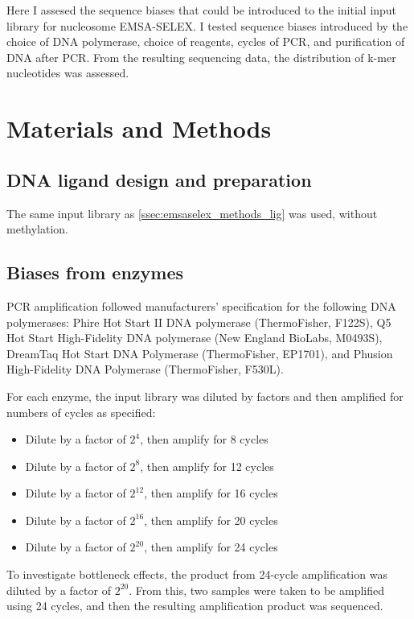 \documentclass[parskip=full, numbers=noenddot]{scrreprt}
\begin{document}
Here I assesed the sequence biases that could be introduced to the initial input library for nucleosome EMSA-SELEX.  I tested sequence biases introduced by the choice of DNA polymerase, choice of reagents, cycles of PCR, and purification of DNA after PCR.  From the resulting sequencing data, the distribution of k-mer nucleotides was assessed.

\section{Materials and Methods}
\label{sec:pcrbias_methods}

\subsection{DNA ligand design and preparation}
\label{ssec:pcrbias_methods_lig}

The same input library as \ref{ssec:emsaselex_methods_lig} was used, without methylation.

\subsection{Biases from enzymes}
\label{ssec:pcrbias_methods_enz}

PCR amplification followed manufacturers' specification for the following DNA polymerases: Phire Hot Start II DNA polymerase (ThermoFisher, F122S), Q5 Hot Start High-Fidelity DNA polymerase (New England BioLabs, M0493S), DreamTaq Hot Start DNA Polymerase (ThermoFisher, EP1701), and Phusion High-Fidelity DNA Polymerase (ThermoFisher, F530L).

For each enzyme, the input library was diluted by factors and then amplified for numbers of cycles as specified:

\begin{itemize}
  \item Dilute by a factor of $2^{4}$, then amplify for 8 cycles
  \item Dilute by a factor of $2^{8}$, then amplify for 12 cycles
  \item Dilute by a factor of $2^{12}$, then amplify for 16 cycles
  \item Dilute by a factor of $2^{16}$, then amplify for 20 cycles
  \item Dilute by a factor of $2^{20}$, then amplify for 24 cycles
\end{itemize}
    
To investigate bottleneck effects, the product from 24-cycle amplification was diluted by a factor of $2^{20}$.  From this, two samples were taken to be amplified using 24 cycles, and then the resulting amplification product was sequenced.
\end{document}
